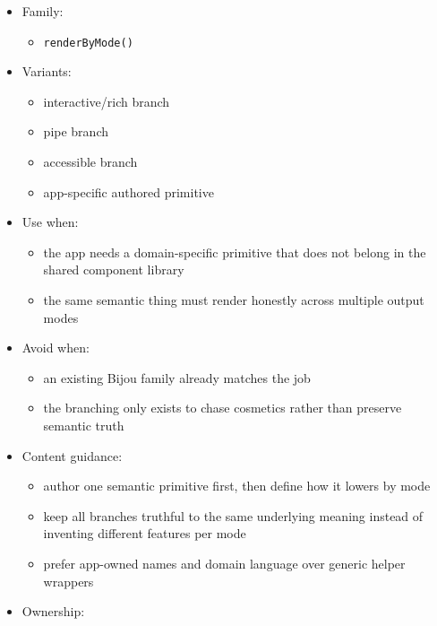 \begin{itemize}
\tightlist
\item
  Family:

  \begin{itemize}
  \tightlist
  \item
    \texttt{r\allowbreak{}e\allowbreak{}n\allowbreak{}d\allowbreak{}e\allowbreak{}r\allowbreak{}B\allowbreak{}y\allowbreak{}M\allowbreak{}o\allowbreak{}d\allowbreak{}e\allowbreak{}(\allowbreak{})}
  \end{itemize}
\item
  Variants:

  \begin{itemize}
  \tightlist
  \item
    interactive/rich branch
  \item
    pipe branch
  \item
    accessible branch
  \item
    app-specific authored primitive
  \end{itemize}
\item
  Use when:

  \begin{itemize}
  \tightlist
  \item
    the app needs a domain-specific primitive that does not belong in the shared component library
  \item
    the same semantic thing must render honestly across multiple output modes
  \end{itemize}
\item
  Avoid when:

  \begin{itemize}
  \tightlist
  \item
    an existing Bijou family already matches the job
  \item
    the branching only exists to chase cosmetics rather than preserve semantic truth
  \end{itemize}
\item
  Content guidance:

  \begin{itemize}
  \tightlist
  \item
    author one semantic primitive first, then define how it lowers by mode
  \item
    keep all branches truthful to the same underlying meaning instead of inventing different features per mode
  \item
    prefer app-owned names and domain language over generic helper wrappers
  \end{itemize}
\item
  Ownership:


\end{itemize}
